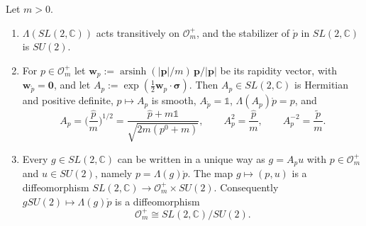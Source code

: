 	\begin{proposition}\label{prop:orbit}
		Let $m>0$.
		\begin{enumerate}
			\item $\Lambda(SL(2,\mathbb{C}))$ acts transitively on $\mathcal{O}_m^+$, and the stabilizer of $\mathring{p}$ in $SL(2,\mathbb{C})$ is $SU(2)$.
			\item For $p\in\mathcal{O}_m^+$ let $\mathbf{w}_p:=\operatorname{arsinh}(|\mathbf{p}|/m)\,\mathbf{p}/|\mathbf{p}|$ be its rapidity vector, with $\mathbf{w}_{\mathring{p}}=\mathbf{0}$, and let $A_p:=\exp(\tfrac12\mathbf{w}_p\cdot\boldsymbol{\sigma})$. Then $A_p\in SL(2,\mathbb{C})$ is Hermitian and positive definite, $p\mapsto A_p$ is smooth, $A_{\mathring{p}}=\mathbb{1}$, $\Lambda(A_p)\mathring{p}=p$, and
			\begin{equation}\label{eq:standard-boost}
				A_p=\Big(\frac{\hat{p}}{m}\Big)^{1/2}=\frac{\hat{p}+m\mathbb{1}}{\sqrt{2m(p^0+m)}},\qquad A_p^2=\frac{\hat{p}}{m},\qquad A_p^{-2}=\frac{\tilde{p}}{m}.
			\end{equation}
			\item Every $g\in SL(2,\mathbb{C})$ can be written in a unique way as $g=A_pu$ with $p\in\mathcal{O}_m^+$ and $u\in SU(2)$, namely $p=\Lambda(g)\mathring{p}$. The map $g\mapsto(p,u)$ is a diffeomorphism $SL(2,\mathbb{C})\to\mathcal{O}_m^+\times SU(2)$. Consequently $gSU(2)\mapsto\Lambda(g)\mathring{p}$ is a diffeomorphism
			\begin{equation*}
				\mathcal{O}_m^+\cong SL(2,\mathbb{C})/SU(2).
			\end{equation*}
		\end{enumerate}
	\end{proposition}
	
